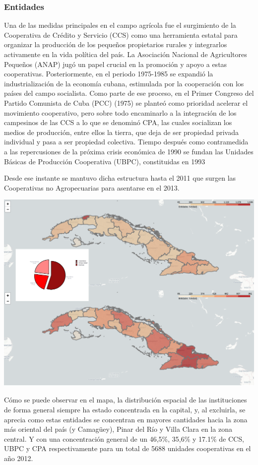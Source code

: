 \documentclass{article}
\begin{document}
\subsubsection{Entidades}
Una de las medidas principales en el campo agrícola fue el surgimiento de la Cooperativa de Crédito y Servicio (CCS) como una herramienta estatal para organizar la producción de los pequeños propietarios rurales y integrarlos activamente en la vida política 
del país. La Asociación Nacional de Agricultores Pequeños (ANAP) jugó un papel crucial en la promoción y apoyo a estas cooperativas. Posteriormente, en el periodo 1975-1985 se expandió la industrialización de la economía cubana, estimulada por la cooperación 
con los países del campo socialista. Como parte de ese proceso, en el Primer Congreso del Partido Comunista de Cuba (PCC) (1975) se planteó como prioridad acelerar el movimiento cooperativo, pero sobre todo encaminarlo a la integración de los campesinos de las 
CCS a lo que se denominó CPA, las cuales socializan los medios de producción, entre ellos la tierra, que deja de ser propiedad privada individual y pasa a ser propiedad colectiva. Tiempo después como contramedida a las repercusiones de la próxima crisis económica de 
1990 se fundan las Unidades Básicas de Producción Cooperativa (UBPC), constituidas en 1993

\clearpage
Desde ese instante se mantuvo dicha estructura hasta el 2011 que surgen las Cooperativas no Agropecuarias para asentarse en el 2013.
\begin{center}
    \includegraphics[width=1.0\textwidth]{img/mapa.png}
\end{center}
Cómo se puede observar en el mapa, la distribución espacial de las instituciones de forma general siempre ha estado concentrada en la capital, y, al excluirla, se aprecia como estas entidades se concentran en mayores cantidades hacia la zona más oriental del país (y Camagüey),
Pinar del Río y Villa Clara en la zona central. Y con una concentración general de un 46,5\%, 35,6\% y 17.1\% de CCS, UBPC y CPA respectivamente para un total de 5688 unidades cooperativas en el año 2012.
\end{document}
